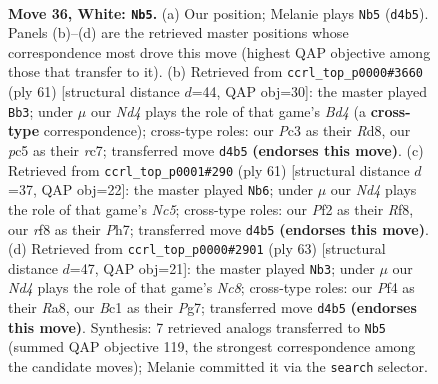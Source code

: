 \documentclass[11pt]{article}
\begin{document}
\clearpage

\begin{figure}[p]\centering
\begin{subfigure}{0.46\textwidth}\centering
\resizebox{\linewidth}{!}{%
\newchessgame
\chessboard[
  setfen={5r2/1p1kp2p/n5p1/p1p5/3N1P1P/2P5/P4PK1/n1B4R w - - 0 36},
  showmover=false,
  pgfstyle=straightmove, color=movearrow, markmove={d4-b5}
]}
\caption{}
\end{subfigure}\hfill
\begin{subfigure}{0.46\textwidth}\centering
\resizebox{\linewidth}{!}{%
\newchessgame
\chessboard[
  setfen={3r2k1/p1Rn1ppp/4p3/1P1b4/p3PP2/6P1/3NB2P/6K1 b - - 0 31},
  showmover=false,
  pgfstyle=straightmove, color=movearrow, markmove={d5-b3}
]}
\caption{}
\end{subfigure}
\\[4pt]
\begin{subfigure}{0.46\textwidth}\centering
\resizebox{\linewidth}{!}{%
\newchessgame
\chessboard[
  setfen={5r1k/2p2ppp/8/1p6/1pnPN3/1P5P/5PP1/R5K1 b - - 0 31},
  showmover=false,
  pgfstyle=straightmove, color=movearrow, markmove={c4-b6}
]}
\caption{}
\end{subfigure}\hfill
\begin{subfigure}{0.46\textwidth}\centering
\resizebox{\linewidth}{!}{%
\newchessgame
\chessboard[
  setfen={r5k1/6pp/4p3/6b1/p5P1/P1N5/1P3B1P/2nR3K b - - 4 32},
  showmover=false,
  pgfstyle=straightmove, color=movearrow, markmove={c1-b3}
]}
\caption{}
\end{subfigure}
\caption{\textbf{Move 36, White: \texttt{Nb5}.} (a) Our position; Melanie plays \texttt{Nb5} (\texttt{d4b5}). Panels (b)--(d) are the retrieved master positions whose correspondence most drove this move (highest QAP objective among those that transfer to it). (b) Retrieved from \texttt{ccrl\_top\_p0000\#3660} (ply 61) [structural distance $d$=44, QAP obj=30]: the master played \texttt{Bb3}; under $\mu$ our \emph{Nd4} plays the role of that game's \emph{Bd4} (a \textbf{cross-type} correspondence); cross-type roles: our \emph{P}c3 as their \emph{R}d8, our \emph{p}c5 as their \emph{r}c7; transferred move \texttt{d4b5} \textbf{(endorses this move)}. (c) Retrieved from \texttt{ccrl\_top\_p0001\#290} (ply 61) [structural distance $d$=37, QAP obj=22]: the master played \texttt{Nb6}; under $\mu$ our \emph{Nd4} plays the role of that game's \emph{Nc5}; cross-type roles: our \emph{P}f2 as their \emph{R}f8, our \emph{r}f8 as their \emph{P}h7; transferred move \texttt{d4b5} \textbf{(endorses this move)}. (d) Retrieved from \texttt{ccrl\_top\_p0000\#2901} (ply 63) [structural distance $d$=47, QAP obj=21]: the master played \texttt{Nb3}; under $\mu$ our \emph{Nd4} plays the role of that game's \emph{Nc8}; cross-type roles: our \emph{P}f4 as their \emph{R}a8, our \emph{B}c1 as their \emph{P}g7; transferred move \texttt{d4b5} \textbf{(endorses this move)}. Synthesis: 7 retrieved analogs transferred to \texttt{Nb5} (summed QAP objective 119, the strongest correspondence among the candidate moves); Melanie committed it via the \texttt{search} selector.}
\label{fig:thought-m70}
\end{figure}
\end{document}
